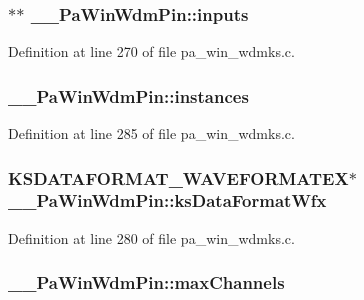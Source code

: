 \subsubsection[{\texorpdfstring{inputs}{inputs}}]{$\ast$$\ast$ \+\_\+\+\_\+\+Pa\+Win\+Wdm\+Pin\+::inputs}\hypertarget{struct_____pa_win_wdm_pin_ae08e82747f231ea0365211c5dbbc48a7}{}\label{struct_____pa_win_wdm_pin_ae08e82747f231ea0365211c5dbbc48a7}


Definition at line 270 of file pa\+\_\+win\+\_\+wdmks.\+c.

\subsubsection[{\texorpdfstring{instances}{instances}}]{ \+\_\+\+\_\+\+Pa\+Win\+Wdm\+Pin\+::instances}\hypertarget{struct_____pa_win_wdm_pin_a72ae21ecfd85a9ef47d80f8d75e0aea4}{}\label{struct_____pa_win_wdm_pin_a72ae21ecfd85a9ef47d80f8d75e0aea4}


Definition at line 285 of file pa\+\_\+win\+\_\+wdmks.\+c.

\subsubsection[{\texorpdfstring{ks\+Data\+Format\+Wfx}{ksDataFormatWfx}}]{\setlength{\rightskip}{0pt plus 5cm}K\+S\+D\+A\+T\+A\+F\+O\+R\+M\+A\+T\+\_\+\+W\+A\+V\+E\+F\+O\+R\+M\+A\+T\+EX$\ast$ \+\_\+\+\_\+\+Pa\+Win\+Wdm\+Pin\+::ks\+Data\+Format\+Wfx}\hypertarget{struct_____pa_win_wdm_pin_ac22b41ab27423a1fe5b96d1b675d62cb}{}\label{struct_____pa_win_wdm_pin_ac22b41ab27423a1fe5b96d1b675d62cb}


Definition at line 280 of file pa\+\_\+win\+\_\+wdmks.\+c.

\subsubsection[{\texorpdfstring{max\+Channels}{maxChannels}}]{ \+\_\+\+\_\+\+Pa\+Win\+Wdm\+Pin\+::max\+Channels}\hypertarget{struct_____pa_win_wdm_pin_a33c12a0dbd09db02923a4bd4e7d2fb17}{}\label{struct_____pa_win_wdm_pin_a33c12a0dbd09db02923a4bd4e7d2fb17}


